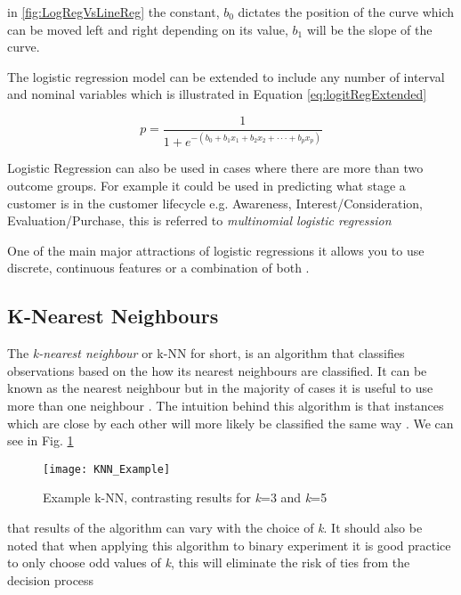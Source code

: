 in \ref{fig:LogRegVsLineReg} the constant, $b_0$ dictates the position of the curve which can be moved left and right depending on its value, $b_1$ will be the slope of the curve. 

The logistic regression model can be extended to include any number of interval and nominal variables which is illustrated in Equation \ref{eq:logitRegExtended}

\begin{equation} \label{eq:logitRegExtended}
	p  =  \frac{1}{1 + e^{-(b_0 + b_1x_1 + b_2x_2 +\cdot\cdot\cdot+ b_px_p )}}
\end{equation}

Logistic Regression can also be used in cases where there are more than two outcome groups. For example it could be used in predicting what stage a customer is in the customer lifecycle e.g. Awareness, Interest/Consideration, Evaluation/Purchase, this is referred to \textit{multinomial logistic regression}


One of the main major attractions of logistic regressions it allows you to use discrete, continuous features or a combination of both \citep{lee_application_2005}.

\subsection{K-Nearest Neighbours} \label{kNN}
The \textit{k-nearest neighbour} or {k-NN} for short, is an algorithm that classifies observations based on the how its nearest neighbours are classified. It can be known as the nearest neighbour but in the majority of cases it is useful to use more than one neighbour \citep{henley_k-nearest-neighbour_1996}. The intuition behind this algorithm is that instances which are close by each other will more likely be classified the same way \citep{cover_nearest_1967}. We can see in Fig. \ref{fig:KNN_Example}\\ %


\begin{figure}[H]
	\texttt{[image: KNN\_Example]}
	\caption{Example k-NN, contrasting results for \textit{k}=3 and \textit{k}=5 }
	\label{fig:KNN_Example}
\end{figure}

that results of the algorithm can vary with the choice of \textit{k}. It should also be noted that when applying this algorithm to binary experiment it is good practice to only choose odd values of \textit{k}, this will eliminate the risk of ties from the decision process \citep{keller_fuzzy_1985} 

